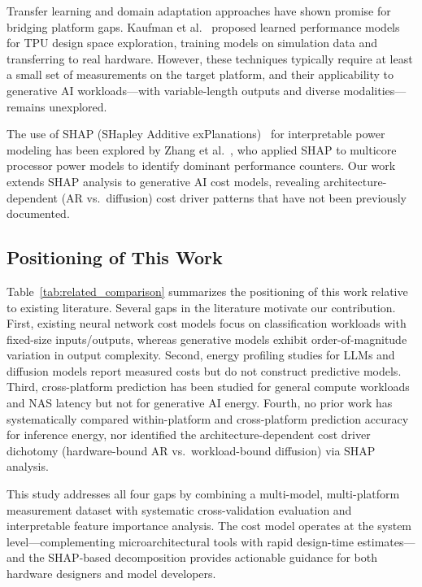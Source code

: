 \documentclass[preprint,review,12pt]{elsarticle}
\begin{document}
Transfer learning and domain adaptation approaches have shown promise for bridging platform gaps.
Kaufman et al.~\cite{kaufman2021learned} proposed learned performance models for TPU design space exploration, training models on simulation data and transferring to real hardware.
However, these techniques typically require at least a small set of measurements on the target platform, and their applicability to generative AI workloads---with variable-length outputs and diverse modalities---remains unexplored.

The use of SHAP (SHapley Additive exPlanations)~\cite{lundberg2017shap} for interpretable power modeling has been explored by Zhang et al.~\cite{zhang2020shap}, who applied SHAP to multicore processor power models to identify dominant performance counters.
Our work extends SHAP analysis to generative AI cost models, revealing architecture-dependent (AR vs.\ diffusion) cost driver patterns that have not been previously documented.

\subsection{Positioning of This Work}
\label{sec:rw_positioning}

Table~\ref{tab:related_comparison} summarizes the positioning of this work relative to existing literature.
Several gaps in the literature motivate our contribution.
First, existing neural network cost models focus on classification workloads with fixed-size inputs/outputs, whereas generative models exhibit order-of-magnitude variation in output complexity.
Second, energy profiling studies for LLMs and diffusion models report measured costs but do not construct predictive models.
Third, cross-platform prediction has been studied for general compute workloads and NAS latency but not for generative AI energy.
Fourth, no prior work has systematically compared within-platform and cross-platform prediction accuracy for inference energy, nor identified the architecture-dependent cost driver dichotomy (hardware-bound AR vs.\ workload-bound diffusion) via SHAP analysis.

This study addresses all four gaps by combining a multi-model, multi-platform measurement dataset with systematic cross-validation evaluation and interpretable feature importance analysis.
The cost model operates at the system level---complementing microarchitectural tools with rapid design-time estimates---and the SHAP-based decomposition provides actionable guidance for both hardware designers and model developers.
\end{document}
